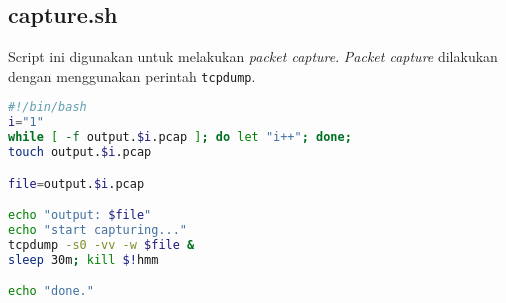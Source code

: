 \subsection{capture.sh}

Script ini digunakan untuk melakukan \textit{packet capture}. \textit{Packet capture} dilakukan dengan menggunakan perintah \verb|tcpdump|.

\begin{lstlisting}[language=Bash]
#!/bin/bash
i="1"
while [ -f output.$i.pcap ]; do let "i++"; done;
touch output.$i.pcap

file=output.$i.pcap

echo "output: $file"
echo "start capturing..."
tcpdump -s0 -vv -w $file &
sleep 30m; kill $!hmm

echo "done."
\end{lstlisting}

